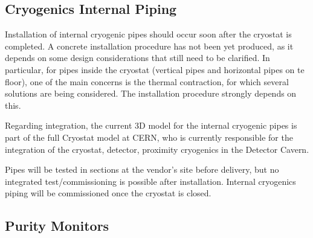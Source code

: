
\subsection{Cryogenics Internal Piping}
\label{sec:fdgen-slow-cryo-install-pipes}

Installation of internal cryogenic pipes should occur soon after the cryostat is completed. A concrete installation procedure has not been yet produced, as it depends
on some design considerations that still need to be clarified. In particular, for pipes inside the cryostat
(vertical pipes and horizontal pipes on te floor), one of the main concerns is the thermal contraction, for which  
several solutions are being considered. The installation procedure strongly depends on this.

Regarding integration, the current 3D model for the internal cryogenic pipes is part of the full Cryostat model at CERN, who is currently responsible for the integration of the cryostat,
detector, proximity cryogenics in the Detector Cavern.

Pipes will be tested in sections at the vendor's site before delivery, but no integrated test/commissioning is possible after installation. Internal cryogenics piping will
be commissioned once the cryostat is closed.   

\subsection{Purity Monitors}
\label{sec:fdgen-slow-cryo-instal-pm}

